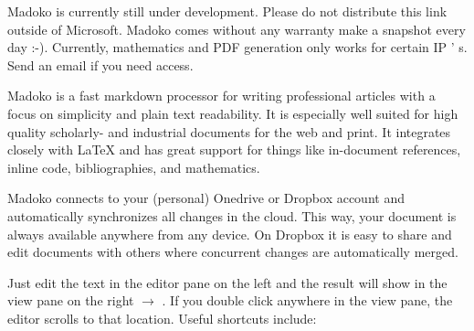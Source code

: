 \documentclass{book}
\begin{document}

\mdMaketitle{}
\begin{mdDiv}[class={note,block},elem={note},data-line={7}]%
\begin{mdP}[data-line={7}]%
{}%
{}
Madoko is currently still under development. Please do not distribute
this link outside of Microsoft. Madoko comes without any warranty%
{} %
{}{\textendash}%
{}
make a snapshot every day :-). Currently, mathematics and PDF generation only
works for certain IP%
{}{'}%
{}s. Send an email if you need access.%
\end{mdP}%
\end{mdDiv}%
\begin{mdP}[data-line={16}]%
{}Madoko is a fast markdown processor for writing professional articles
with a focus on simplicity and plain text readability. It is especially
well suited for high quality scholarly- and industrial documents for
the web and print. It integrates closely with LaTeX and has great
support for things like in-document references, inline code,
bibliographies, and mathematics.%
\end{mdP}%
\begin{mdP}[class={indent},data-line={23}]%
{}Madoko connects to your (personal) Onedrive or Dropbox account and
automatically synchronizes all changes in the cloud. This way, your
document is always available anywhere from any device. On Dropbox it is
easy to share and edit documents with others where concurrent changes
are automatically merged.%
\end{mdP}%
\begin{mdP}[class={para-continue},data-line={31}]%
{}Just edit the text in the editor pane on the left and the result will
show in the view pane on the right %
{}\ensuremath{\rightarrow}%
{}. If you double click anywhere in
the view pane, the editor scrolls to that location. Useful shortcuts
include:%
\end{mdP}%
\end{document}
